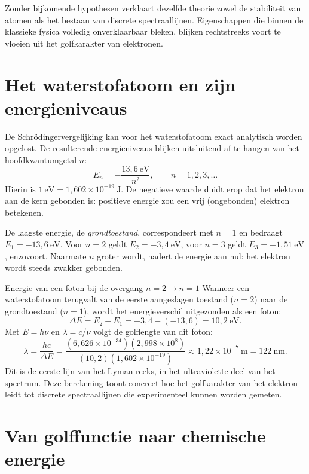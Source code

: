 Zonder bijkomende hypothesen verklaart dezelfde theorie zowel de stabiliteit van atomen als het bestaan van discrete spectraallijnen. Eigenschappen die binnen de klassieke fysica volledig onverklaarbaar bleken, blijken rechtstreeks voort te vloeien uit het golfkarakter van elektronen.

\section{Het waterstofatoom en zijn energieniveaus}

De Schr\"odingervergelijking kan voor het waterstofatoom exact analytisch worden opgelost. De resulterende energieniveaus blijken uitsluitend af te hangen van het hoofdkwantumgetal $n$:
\begin{equation}
E_n = -\frac{13{,}6~\mathrm{eV}}{n^2}, \qquad n = 1,2,3,\ldots
\end{equation}
Hierin is $1~\mathrm{eV} = 1{,}602 \times 10^{-19}~\mathrm{J}$. De negatieve waarde duidt erop dat het elektron aan de kern gebonden is: positieve energie zou een vrij (ongebonden) elektron betekenen.

De laagste energie, de \emph{grondtoestand}, correspondeert met $n=1$ en bedraagt $E_1 = -13{,}6~\mathrm{eV}$. Voor $n=2$ geldt $E_2 = -3{,}4~\mathrm{eV}$, voor $n=3$ geldt $E_3 = -1{,}51~\mathrm{eV}$, enzovoort. Naarmate $n$ groter wordt, nadert de energie aan nul: het elektron wordt steeds zwakker gebonden.

\begin{voorbeeld}{Energie van een foton bij de overgang $n=2 \to n=1$}
Wanneer een waterstofatoom terugvalt van de eerste aangeslagen toestand ($n=2$) naar de grondtoestand ($n=1$), wordt het energieverschil uitgezonden als een foton:
\[
\Delta E = E_2 - E_1 = -3{,}4 - (-13{,}6) = 10{,}2~\mathrm{eV}.
\]
Met $E = h\nu$ en $\lambda = c/\nu$ volgt de golflengte van dit foton:
\[
\lambda = \frac{hc}{\Delta E} = \frac{(6{,}626\times 10^{-34})(2{,}998\times 10^{8})}{(10{,}2)(1{,}602\times 10^{-19})} \approx 1{,}22 \times 10^{-7}~\mathrm{m} = \SI{122}{\nano\meter}.
\]
Dit is de eerste lijn van het Lyman-reeks, in het ultraviolette deel van het spectrum. Deze berekening toont concreet hoe het golfkarakter van het elektron leidt tot discrete spectraallijnen die experimenteel kunnen worden gemeten.
\end{voorbeeld}

\section{Van golffunctie naar chemische energie}

